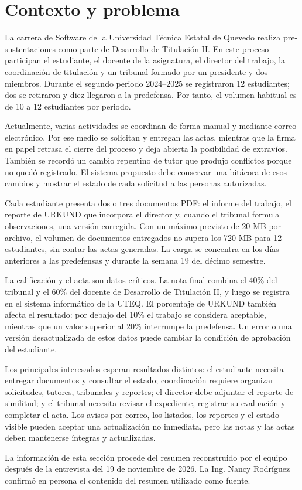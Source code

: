 \section{Contexto y problema}

La carrera de Software de la Universidad Técnica Estatal de Quevedo realiza
pre-sustentaciones como parte de Desarrollo de Titulación II. En este proceso
participan el estudiante, el docente de la asignatura, el director del trabajo,
la coordinación de titulación y un tribunal formado por un presidente y dos
miembros. Durante el segundo periodo 2024--2025 se registraron 12 estudiantes;
dos se retiraron y diez llegaron a la predefensa. Por tanto, el volumen habitual
es de 10 a 12 estudiantes por periodo.

Actualmente, varias actividades se coordinan de forma manual y mediante correo
electrónico. Por ese medio se solicitan y entregan las actas, mientras que la
firma en papel retrasa el cierre del proceso y deja abierta la posibilidad de
extravíos. También se recordó un cambio repentino de tutor que produjo
conflictos porque no quedó registrado. El sistema propuesto debe conservar una
bitácora de esos cambios y mostrar el estado de cada solicitud a las personas
autorizadas.

Cada estudiante presenta dos o tres documentos PDF: el informe del trabajo, el
reporte de URKUND que incorpora el director y, cuando el tribunal formula
observaciones, una versión corregida. Con un máximo previsto de 20 MB por
archivo, el volumen de documentos entregados no supera los 720 MB para 12
estudiantes, sin contar las actas generadas. La carga se concentra en los días
anteriores a las predefensas y durante la semana 19 del décimo semestre.

La calificación y el acta son datos críticos. La nota final combina el 40\% del
tribunal y el 60\% del docente de Desarrollo de Titulación II, y luego se
registra en el sistema informático de la UTEQ. El porcentaje de URKUND también
afecta el resultado: por debajo del 10\% el trabajo se considera aceptable,
mientras que un valor superior al 20\% interrumpe la predefensa. Un error o una
versión desactualizada de estos datos puede cambiar la condición de aprobación
del estudiante.

Los principales interesados esperan resultados distintos: el estudiante
necesita entregar documentos y consultar el estado; coordinación requiere
organizar solicitudes, tutores, tribunales y reportes; el director debe adjuntar
el reporte de similitud; y el tribunal necesita revisar el expediente, registrar
su evaluación y completar el acta. Los avisos por correo, los listados, los
reportes y el estado visible pueden aceptar una actualización no inmediata,
pero las notas y las actas deben mantenerse íntegras y actualizadas.

La información de esta sección procede del resumen reconstruido por el equipo
después de la entrevista del 19 de noviembre de 2026. La Ing. Nancy Rodríguez
confirmó en persona el contenido del resumen utilizado como fuente.
